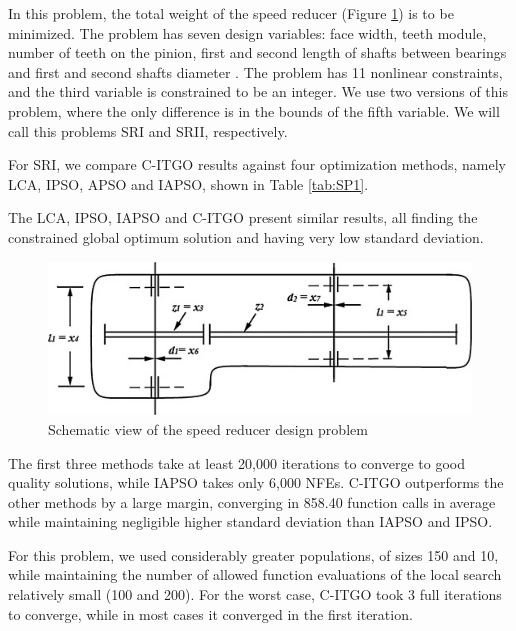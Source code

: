 In this problem, the total weight of the speed reducer (Figure \ref{fig:SR}) is to be minimized. The problem has seven design variables: face width, teeth module, number of teeth on the pinion, first and second length of shafts between bearings and first and second shafts diameter \citep{SR}. The problem has 11 nonlinear constraints, and the third variable is constrained to be an integer. We use two versions of this problem, where the only difference is in the bounds of the fifth variable. We will call this problems SRI and SRII, respectively.


For SRI, we compare C-ITGO results against four optimization methods, namely LCA, IPSO, APSO and IAPSO, shown in Table \ref{tab:SP1}.

The LCA, IPSO, IAPSO and C-ITGO present similar results, all finding the constrained global optimum solution and having very low standard deviation.

\begin{figure}[h]
    \begin{center}
    \includegraphics[scale=0.6]{Imgs/SR.jpg}
    \end{center}
    \captionsetup{justification=centering}
    \caption{Schematic view of the speed reducer design problem}\label{fig:SR}
\end{figure}




The first three methods take at least 20,000 iterations to converge to good quality solutions, while IAPSO takes only 6,000 NFEs. C-ITGO outperforms the other methods by a large margin, converging in 858.40 function calls in average while maintaining negligible higher standard deviation than IAPSO and IPSO.

For this problem, we used considerably greater populations, of sizes 150 and 10, while maintaining the number of allowed function evaluations of the local search relatively small (100 and 200). For the worst case, C-ITGO took 3 full iterations to converge, while in most cases it converged in the first iteration.

